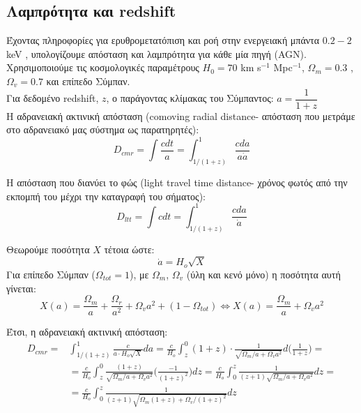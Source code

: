\subsection{Λαμπρότητα και \textlatin{redshift}}

Έχοντας πληροφορίες για ερυθρομετατόπιση και ροή στην ενεργειακή μπάντα $0.2-2$ \textlatin{keV} \cite{2017MNRAS.469.3232G}, υπολογίζουμε απόσταση και λαμπρότητα για κάθε μία πηγή (\textlatin{AGN})\cite{2006PASP..118.1711W}. Χρησιμοποιούμε τις κοσμολογικές παραμέτρους $H_0 = 70$ \textlatin{km  s}$^{-1}$ \textlatin{Mpc}$^{-1}$, $\Omega_m = 0.3$ , $\Omega_v=0.7$ και επίπεδο Σύμπαν.\\
Για δεδομένο \textlatin{redshift}, $z$, ο παράγοντας κλίμακας του Σύμπαντος:   $a = \dfrac{1}{1+z}$\\
Η αδρανειακή ακτινική απόσταση (\textlatin{comoving radial distance}- απόσταση που μετράμε στο αδρανειακό μας σύστημα ως παρατηρητές)\cite{2006PASP..118.1711W}:
\begin{equation}
D_{cmr} =  \int \frac{c dt}{a} = \int_{1/(1+z)}^1 \frac {cda}{a\dot a}
\end{equation}

Η απόσταση που διανύει το φώς (\textlatin{light travel time distance}- χρόνος φωτός από την εκπομπή του μέχρι την καταγραφή του σήματος)\cite{2006PASP..118.1711W}:
\begin{equation} D_{ltt} =  \int c dt = \int_{1/(1+z)}^1 \frac {cda}{\dot a} \end{equation}

Θεωρούμε ποσότητα $X$ τέτοια ώστε: \begin{equation} \dot a = H_o \sqrt X \end{equation}
Για επίπεδο Σύμπαν ($\Omega_{tot}=1$), με $\Omega_m$, $\Omega_v$ (ύλη και κενό μόνο) η ποσότητα αυτή γίνεται:    
\begin{equation} X(a) = \frac{\Omega_m}{a} + \frac{\Omega_r}{a^2} + \Omega_{v} a^2 + (1-\Omega_{tot}) \iff X(a) = \frac{\Omega_m}{a} + \Omega_v a^2 \end{equation}  

Έτσι, η αδρανειακή ακτινική απόσταση:
\begin{equation} 
\begin{aligned}
D_{cmr} =  {} &  \int_{1/(1+z)}^1 \frac {c }{a\cdot H_o \sqrt X} da = \frac{c}{H_o}  \int_{z}^0  (1+z) \cdot \frac{1}{\sqrt{\Omega_m/a + \Omega_v a^2 }} d \big( \frac{1}{1+z} \big) = \\
& =\frac{c}{H_o}  \int_{z}^0  \frac{(1+z)}{\sqrt{\Omega_m/a + \Omega_v a^2 }} \Big( \frac{-1}{(1+z)^2} \Big) dz = %
\frac{c}{H_o}  \int_0^{z} \frac{1}{(z+1) \sqrt{\Omega_m/a + \Omega_v a^2 }} dz = \\ & =\frac{c}{H_o}  \int_0^{z} \frac{1}{(z+1) \sqrt{\Omega_m (1+z) + \Omega_v / (1+z)^2 }} dz \label{eq:Dcmr}
\end{aligned}
\end{equation}

